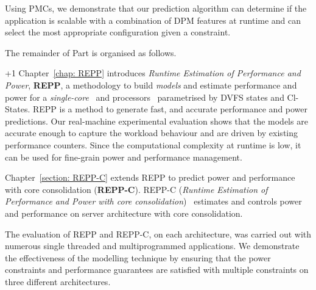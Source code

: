 Using PMCs, we demonstrate that our prediction algorithm can determine if the application
is scalable with a combination of DPM features at runtime and can select the most
appropriate configuration given a constraint.

The remainder of Part  is organised as follows.


\looseness +1 Chapter~\ref{chap: REPP} introduces \textit{Runtime Estimation of Performance
and Power}, \textbf{REPP}, a methodology to build \textsl{models} and estimate performance
and power for a \emph{single-core}~\citep{Nishtala:ICPP} and \emph{\muc}
processors~\citep{Nishtala:SBACPAD} parametrised by DVFS states and Cl-States. REPP is a
method to generate fast, and accurate performance and power predictions. Our real-machine
experimental evaluation shows that the models are accurate enough to capture the workload
behaviour and are driven by existing performance counters.  Since the computational
complexity at runtime is low, it can be used for fine-grain power and performance
management.  


 Chapter~\ref{section: REPP-C} extends REPP to predict power and performance
with core consolidation (\textbf{REPP-C}). REPP-C (\textit{Runtime Estimation of
Performance and Power with core consolidation})~\citep{Nishtala:IGSC} estimates and
controls power and performance on server architecture with core consolidation.


 The evaluation of REPP and REPP-C, on each architecture, was carried out
with numerous single threaded and multiprogrammed applications. We demonstrate the
effectiveness of the modelling technique by ensuring that the power constraints and
performance guarantees are satisfied with multiple constraints on three different
architectures.




\newpage
 

% 

\newpage
 


